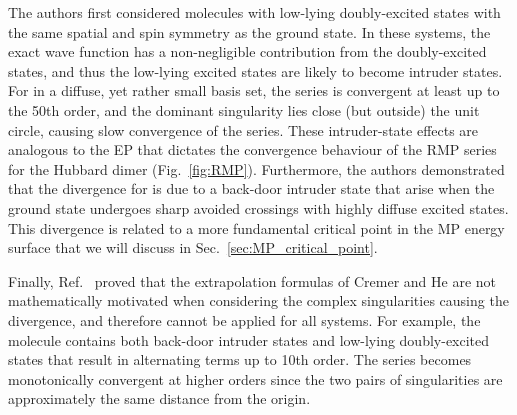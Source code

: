 \documentclass[aps,prb,reprint,noshowkeys,superscriptaddress]{revtex4-1}
\begin{document}
The authors first considered molecules with low-lying doubly-excited states with the same spatial
and spin symmetry as the ground state. \cite{Olsen_2000}
In these systems, the exact wave function has a non-negligible contribution from the doubly-excited states, 
and thus the low-lying excited states are likely to become intruder states. 
For  in a diffuse, yet rather small basis set, the series is convergent at least up to the 50th order, and
the dominant singularity lies close (but outside) the unit circle, causing slow convergence of the series.
These intruder-state effects are analogous to the EP that dictates the convergence behaviour of 
the RMP series for the Hubbard dimer (Fig.~\ref{fig:RMP}).
Furthermore, the authors demonstrated that the divergence for  is due to a back-door intruder state
that arise when the ground state undergoes sharp avoided crossings with highly diffuse excited states.
This divergence is related to a more fundamental critical point in the MP energy surface that we will
discuss in Sec.~\ref{sec:MP_critical_point}.

Finally, Ref.~ proved that the extrapolation formulas of Cremer and He \cite{Cremer_1996}
are not mathematically motivated when considering the complex singularities causing the divergence, and therefore
cannot be applied for all systems.
For example, the  molecule contains both back-door intruder states and low-lying doubly-excited states that
result in alternating terms up to 10th order. 
The series becomes monotonically convergent at higher orders since
the two pairs of singularities are approximately the same distance from the origin.
\end{document}
